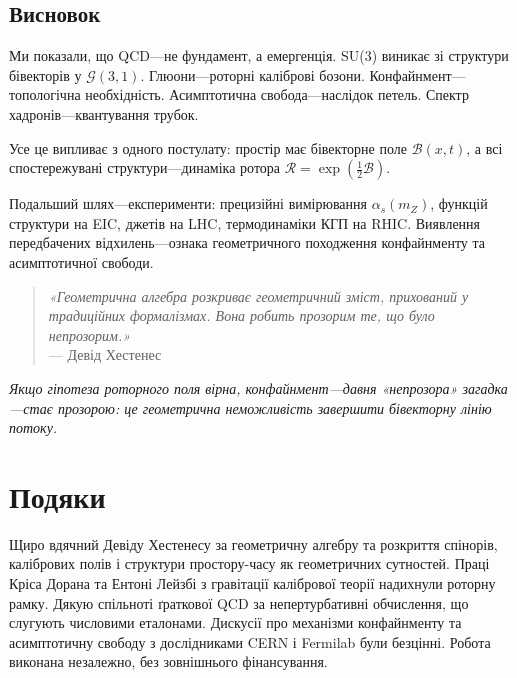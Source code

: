 \documentclass[11pt,a4paper]{article}
\newcommand{\Rotor}{\mathcal{R}}
\newcommand{\Biv}{\mathcal{B}}
\newcommand{\Cl}{\mathcal{G}}
\theoremstyle{definition}
\theoremstyle{plain}
\theoremstyle{remark}
\begin{document}
\subsection{Висновок}

Ми показали, що QCD—не фундамент, а емергенція. SU(3) виникає зі структури бівекторів у $\Cl(3,1)$. Глюони—роторні каліброві бозони. Конфайнмент—топологічна необхідність. Асимптотична свобода—наслідок петель. Спектр хадронів—квантування трубок.

Усе це випливає з одного постулату: простір має бівекторне поле $\Biv(x,t)$, а всі спостережувані структури—динаміка ротора $\Rotor=\exp(\frac{1}{2}\Biv)$.

Подальший шлях—експерименти: прецизійні вимірювання $\alpha_s(m_Z)$, функцій структури на EIC, джетів на LHC, термодинаміки КГП на RHIC. Виявлення передбачених відхилень—ознака геометричного походження конфайнменту та асимптотичної свободи.

\begin{quote}
\textit{«Геометрична алгебра розкриває геометричний зміст, прихований у традиційних формалізмах. Вона робить прозорим те, що було непрозорим.»}\\
— Девід Хестенес
\end{quote}

\noindent\textit{Якщо гіпотеза роторного поля вірна, конфайнмент—давня «непрозора» загадка—стає прозорою: це геометрична неможливість завершити бівекторну лінію потоку.}

\vspace{1em}

\section*{Подяки}

Щиро вдячний Девіду Хестенесу за геометричну алгебру та розкриття спінорів, калібрових полів і структури простору-часу як геометричних сутностей. Праці Кріса Дорана та Ентоні Лейзбі з гравітації калібрової теорії надихнули роторну рамку. Дякую спільноті ґраткової QCD за непертурбативні обчислення, що слугують числовими еталонами. Дискусії про механізми конфайнменту та асимптотичну свободу з дослідниками CERN і Fermilab були безцінні. Робота виконана незалежно, без зовнішнього фінансування.

\vspace{1em}
\end{document}
